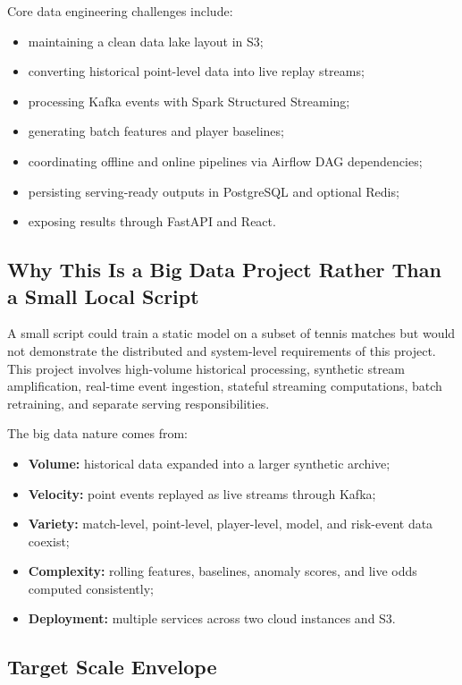 \documentclass[11pt,a4paper]{article}
\begin{document}
Core data engineering challenges include:
\begin{itemize}[nosep]
  \item maintaining a clean data lake layout in S3;
  \item converting historical point-level data into live replay streams;
  \item processing Kafka events with Spark Structured Streaming;
  \item generating batch features and player baselines;
  \item coordinating offline and online pipelines via Airflow DAG dependencies;
  \item persisting serving-ready outputs in PostgreSQL and optional Redis;
  \item exposing results through FastAPI and React.
\end{itemize}

\subsection{Why This Is a Big Data Project Rather Than a Small Local Script}

A small script could train a static model on a subset of tennis matches but would not demonstrate
the distributed and system-level requirements of this project. This project involves high-volume
historical processing, synthetic stream amplification, real-time event ingestion, stateful
streaming computations, batch retraining, and separate serving responsibilities.

The big data nature comes from:
\begin{itemize}[nosep]
  \item \textbf{Volume:} historical data expanded into a larger synthetic archive;
  \item \textbf{Velocity:} point events replayed as live streams through Kafka;
  \item \textbf{Variety:} match-level, point-level, player-level, model, and risk-event data coexist;
  \item \textbf{Complexity:} rolling features, baselines, anomaly scores, and live odds computed consistently;
  \item \textbf{Deployment:} multiple services across two cloud instances and S3.
\end{itemize}

\subsection{Target Scale Envelope}
\end{document}
